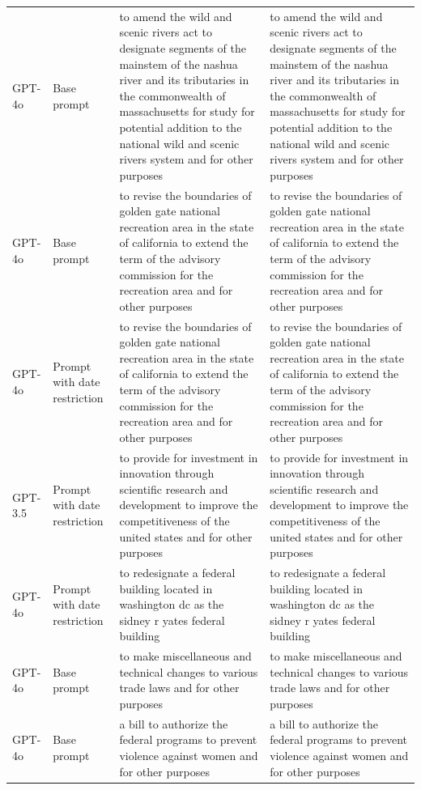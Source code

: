 \begin{longtable}{>{\raggedright\arraybackslash}p{1.4cm}>{\raggedright\arraybackslash}p{1.4cm}>{\raggedright\arraybackslash}p{5.5cm}>{\raggedright\arraybackslash}p{5.5cm}}
GPT-4o & Base prompt & to amend the wild and scenic rivers act to designate segments of the mainstem of the nashua river and its tributaries in the commonwealth of massachusetts for study for potential addition to the national wild and scenic rivers system and for other purposes & to amend the wild and scenic rivers act to designate segments of the mainstem of the nashua river and its tributaries in the commonwealth of massachusetts for study for potential addition to the national wild and scenic rivers system and for other purposes\\
GPT-4o & Base prompt & to revise the boundaries of golden gate national recreation area in the state of california to extend the term of the advisory commission for the recreation area and for other purposes & to revise the boundaries of golden gate national recreation area in the state of california to extend the term of the advisory commission for the recreation area and for other purposes\\
GPT-4o & Prompt with date restriction & to revise the boundaries of golden gate national recreation area in the state of california to extend the term of the advisory commission for the recreation area and for other purposes & to revise the boundaries of golden gate national recreation area in the state of california to extend the term of the advisory commission for the recreation area and for other purposes\\
GPT-3.5 & Prompt with date restriction & to provide for investment in innovation through scientific research and development to improve the competitiveness of the united states and for other purposes & to provide for investment in innovation through scientific research and development to improve the competitiveness of the united states and for other purposes\\
GPT-4o & Prompt with date restriction & to redesignate a federal building located in washington dc as the sidney r yates federal building & to redesignate a federal building located in washington dc as the sidney r yates federal building\\
GPT-4o & Base prompt & to make miscellaneous and technical changes to various trade laws and for other purposes & to make miscellaneous and technical changes to various trade laws and for other purposes\\
GPT-4o & Base prompt & a bill to authorize the federal programs to prevent violence against women and for other purposes & a bill to authorize the federal programs to prevent violence against women and for other purposes\\

\end{longtable}
